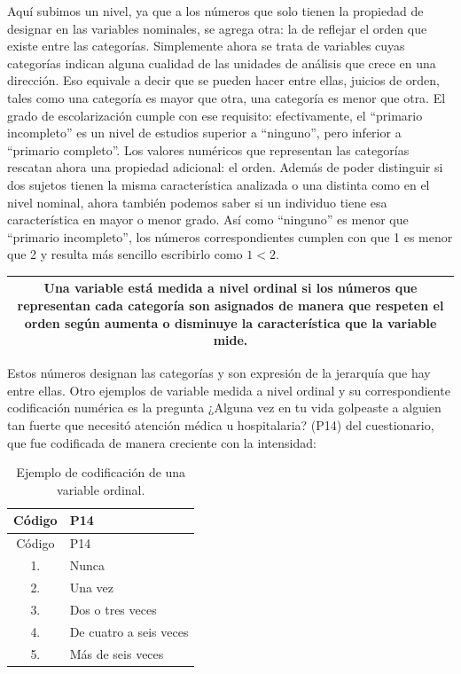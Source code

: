 \documentclass[]{book}
\begin{document}
Aquí subimos un nivel, ya que a los números que solo tienen la propiedad de designar en las variables nominales, se agrega otra: la de reflejar el orden que existe entre las categorías.
Simplemente ahora se trata de variables cuyas categorías indican alguna cualidad de las unidades de análisis que crece en una dirección. Eso equivale a decir que se pueden hacer entre ellas, juicios de orden, tales como una categoría es mayor que otra, una categoría es menor que otra. El grado de escolarización cumple con ese requisito: efectivamente, el ``primario incompleto'' es un nivel de estudios superior a ``ninguno'', pero inferior a ``primario completo''.
Los valores numéricos que representan las categorías rescatan ahora una propiedad adicional: el orden. Además de poder distinguir si dos sujetos tienen la misma característica analizada o una distinta como en el nivel nominal, ahora también podemos saber si un individuo tiene esa característica en mayor o menor grado. Así como ``ninguno'' es menor que ``primario incompleto'', los números correspondientes cumplen con que 1 es menor que 2 y resulta más sencillo escribirlo como \(1 < 2\).

\begin{longtable}[]{@{}c@{}}
\toprule
\endhead
\begin{minipage}[t]{0.97\columnwidth}\centering
Una variable está medida a nivel \textbf{ordinal} si los números que representan cada categoría son asignados de manera que respeten el orden según aumenta o disminuye la característica que la variable mide.\strut
\end{minipage}\tabularnewline
\bottomrule
\end{longtable}

Estos números designan las categorías y son expresión de la jerarquía que hay entre ellas. Otro ejemplos de variable medida a nivel ordinal y su correspondiente codificación numérica es la pregunta ¿Alguna vez en tu vida golpeaste a alguien tan fuerte que necesitó atención médica u hospitalaria? (P14) del cuestionario, que fue codificada de manera creciente con la intensidad:

\begin{longtable}[]{@{}cl@{}}
\caption{\label{tab:unnamed-chunk-9}Ejemplo de codificación de una variable ordinal.}\tabularnewline
\toprule
Código & P14\tabularnewline
\midrule
\endfirsthead
\toprule
Código & P14\tabularnewline
\midrule
\endhead
1. & Nunca\tabularnewline
2. & Una vez\tabularnewline
3. & Dos o tres veces\tabularnewline
4. & De cuatro a seis veces\tabularnewline
5. & Más de seis veces\tabularnewline
\bottomrule
\end{longtable}
\end{document}
